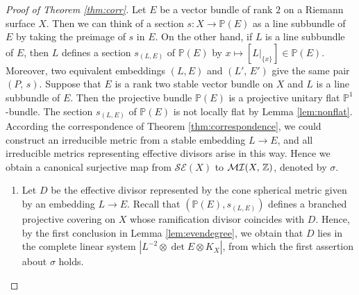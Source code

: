 \documentclass[12pt]{article}
\begin{document}
\begin{proof}[Proof of Theorem \ref{thm:corr}]
Let $E$ be a vector bundle of rank $2$ on a Riemann surface $X$. Then we can think of a section $s \colon X \to \mathbb{P}(E)$ as a line subbundle of $E$ by taking the preimage of $s$ in $E$. On the other hand, if $L$ is a line subbundle of $E$, then $L$ defines a section $s_{(L, E)}$ of $\mathbb{P}(E)$ by $x \mapsto \left[L|_{\{x\}}\right] \in \mathbb{P}(E)$. Moreover, two equivalent embeddings $(L, E)$ and $(L',\, E')$ give the same pair $(P,\,s)$.
Suppose that $E$ is a rank two stable vector bundle on $X$ and $L$ is a line subbundle of $E$. Then the projective bundle $\mathbb{P}(E)$ is a projective unitary flat $\mathbb{P}^1$-bundle. The section $s_{(L, E)}$ of $\mathbb P(E)$ is not locally flat by Lemma \ref{lem:nonflat}. According the correspondence of Theorem \ref{thm:correspondence}, we could construct an irreducible metric from a stable embedding $L \to E$, and all irreducible metrics representing effective divisors arise in this way. Hence we obtain a canonical surjective map from $\mathcal{SE}(X)$ to $\mathcal{MI}(X,\,{\Bbb Z})$, denoted by $\sigma$.

\begin{enumerate}

\item Let $D$ be the effective divisor represented by the cone spherical metric given by an embedding $L \to E$. Recall that $(\mathbb P(E), s_{(L, E)})$ defines a branched projective covering on $X$ whose ramification divisor coincides with $D$. Hence, by the first conclusion in Lemma \ref{lem:evendegree}, we obtain that $D$ lies in the complete linear system $\left| L^{-2} \otimes \det E \otimes K_{X} \right|$, from which the first assertion about $\sigma$ holds.


\end{enumerate}
\end{proof}
\end{document}
